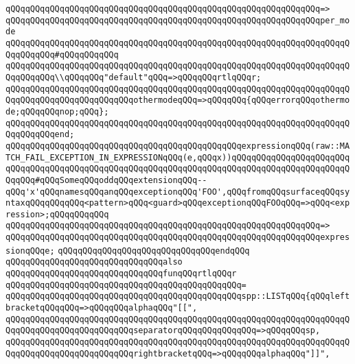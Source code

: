 \verb|qQQqqQQqqQQqqQQqqQQqqQQqqQQqqQQqqQQqqQQqqQQqqQQqqQQqqQQqqQQqqQQq=>|\newline
\verb|qQQqqQQqqQQqqQQqqQQqqQQqqQQqqQQqqQQqqQQqqQQqqQQqqQQqqQQqqQQqqQQqper_mode|\newline
\verb|qQQqqQQqqQQqqQQqqQQqqQQqqQQqqQQqqQQqqQQqqQQqqQQqqQQqqQQqqQQqqQQqqQQqqQQqqQQqqQQq#qQQqqQQqqQQq|\newline
\verb|qQQqqQQqqQQqqQQqqQQqqQQqqQQqqQQqqQQqqQQqqQQqqQQqqQQqqQQqqQQqqQQqqQQqqQQqqQQqqQQq\\qQQqqQQq"default"qQQq=>qQQqqQQqrtlqQQqr;|\newline
\verb|qQQqqQQqqQQqqQQqqQQqqQQqqQQqqQQqqQQqqQQqqQQqqQQqqQQqqQQqqQQqqQQqqQQqqQQqqQQqqQQqqQQqqQQqqQQqqQQqothermodeqQQq=>qQQqqQQq{qQQqerrorqQQqothermode;qQQqqQQqnop;qQQq};|\newline
\verb|qQQqqQQqqQQqqQQqqQQqqQQqqQQqqQQqqQQqqQQqqQQqqQQqqQQqqQQqqQQqqQQqqQQqqQQqqQQqqQQqend;|\newline
\newline
\verb|qQQqqQQqqQQqqQQqqQQqqQQqqQQqqQQqqQQqqQQqqQQqqQQqexpressionqQQq(raw::MATCH_FAIL_EXCEPTION_IN_EXPRESSIONqQQq(e,qQQqx))qQQqqQQqqQQqqQQqqQQqqQQqqQQqqQQqqQQqqQQqqQQqqQQqqQQqqQQqqQQqqQQqqQQqqQQqqQQqqQQqqQQqqQQqqQQqqQQqqQQq#qQQqSomeqQQqoddqQQqextensionqQQq--qQQq'x'qQQqnamesqQQqanqQQqexceptionqQQq'FOO',qQQqfromqQQqsurfaceqQQqsyntaxqQQqqQQqqQQq<pattern>qQQq<guard>qQQqexceptionqQQqFOOqQQq=>qQQq<expression>;qQQqqQQqqQQq|\newline
\verb|qQQqqQQqqQQqqQQqqQQqqQQqqQQqqQQqqQQqqQQqqQQqqQQqqQQqqQQqqQQqqQQq=>|\newline
\verb|qQQqqQQqqQQqqQQqqQQqqQQqqQQqqQQqqQQqqQQqqQQqqQQqqQQqqQQqqQQqqQQqexpressionqQQqe;|\newline
\verb|qQQqqQQqqQQqqQQqqQQqqQQqqQQqqQQqendqQQq|\newline
\newline
\verb|qQQqqQQqqQQqqQQqqQQqqQQqqQQqqQQqalso|\newline
\verb|qQQqqQQqqQQqqQQqqQQqqQQqqQQqqQQqfunqQQqrtlqQQqr|\newline
\verb|qQQqqQQqqQQqqQQqqQQqqQQqqQQqqQQqqQQqqQQqqQQqqQQq=|\newline
\verb|qQQqqQQqqQQqqQQqqQQqqQQqqQQqqQQqqQQqqQQqqQQqqQQqspp::LISTqQQq{qQQqleftbracketqQQqqQQq=>qQQqqQQqalphaqQQq"[[",|\newline
\verb|qQQqqQQqqQQqqQQqqQQqqQQqqQQqqQQqqQQqqQQqqQQqqQQqqQQqqQQqqQQqqQQqqQQqqQQqqQQqqQQqqQQqqQQqqQQqqQQqseparatorqQQqqQQqqQQqqQQq=>qQQqqQQqsp,|\newline
\verb|qQQqqQQqqQQqqQQqqQQqqQQqqQQqqQQqqQQqqQQqqQQqqQQqqQQqqQQqqQQqqQQqqQQqqQQqqQQqqQQqqQQqqQQqqQQqqQQqrightbracketqQQq=>qQQqqQQqalphaqQQq"]]",|\newline
